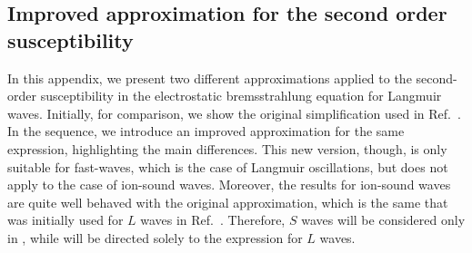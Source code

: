 \documentclass[12pt,a4paper,ruledheader]{report}
\begin{document}
\begin{appendix}
\chapter{Improved approximation for the second order susceptibility}
\label{appA}
\setcounter{equation}{0}
\renewcommand{\theequation}{A\arabic{equation}}
In this appendix, we present two different approximations applied to the
second-order susceptibility in the electrostatic bremsstrahlung equation
for Langmuir waves. Initially, for comparison, we show the original
simplification used in Ref.~\cite{YZKS16}. In the sequence, we introduce
an improved approximation for the same expression, highlighting the main
differences. This new version, though, is only suitable for fast-waves,
which is the case of Langmuir oscillations, but does not apply to the case
of ion-sound waves. Moreover, the results for ion-sound waves are quite
well behaved with the original approximation, which is the same that was
initially used for $L$ waves in Ref.~\cite{YZKS16}.
Therefore, $S$ waves will be considered only in
, while  will be directed solely
to the  expression for $L$ waves.


\end{appendix}
\end{document}

